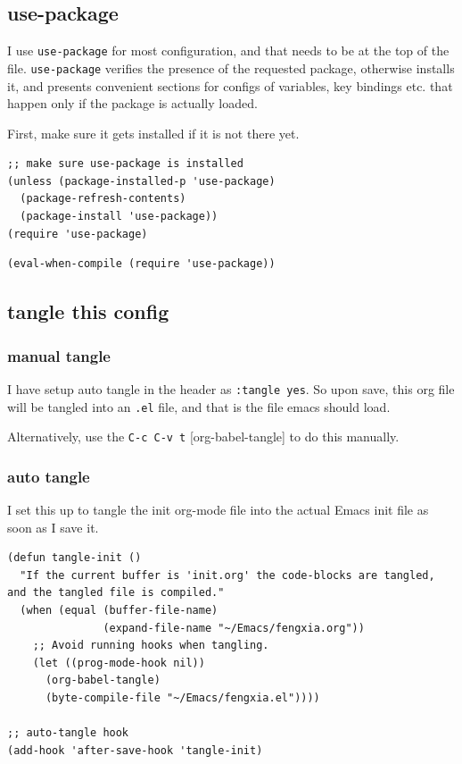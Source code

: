 \documentclass[11pt]{article}
\begin{document}
\subsection{use-package}
\label{sec:orgfc8a1eb}

I use \texttt{use-package} for most configuration, and that needs to be at the
top of the file.  \texttt{use-package} verifies the presence of the requested
package, otherwise installs it, and presents convenient sections for
configs of variables, key bindings etc. that happen only if the
package is actually loaded.

First, make sure it gets installed if it is not there yet.

\begin{verbatim}
;; make sure use-package is installed
(unless (package-installed-p 'use-package)
  (package-refresh-contents)
  (package-install 'use-package))
(require 'use-package)
\end{verbatim}

\begin{verbatim}
(eval-when-compile (require 'use-package))
\end{verbatim}

\subsection{tangle this config}
\label{sec:org7ffb906}
\subsubsection{manual tangle}
\label{sec:org4bb977e}

I have setup auto tangle in the header as \texttt{:tangle yes}. So upon save,
this org file will be tangled into an \texttt{.el} file, and that is the file
emacs should load.

Alternatively, use the \texttt{C-c C-v t} [org-babel-tangle] to do this
manually.

\subsubsection{auto tangle}
\label{sec:org242c211}

I set this up to tangle the init org-mode file into the actual Emacs
init file as soon as I save it.

\begin{verbatim}
(defun tangle-init ()
  "If the current buffer is 'init.org' the code-blocks are tangled,
and the tangled file is compiled."
  (when (equal (buffer-file-name)
               (expand-file-name "~/Emacs/fengxia.org"))
    ;; Avoid running hooks when tangling.
    (let ((prog-mode-hook nil))
      (org-babel-tangle)
      (byte-compile-file "~/Emacs/fengxia.el"))))

;; auto-tangle hook
(add-hook 'after-save-hook 'tangle-init)
\end{verbatim}
\end{document}
